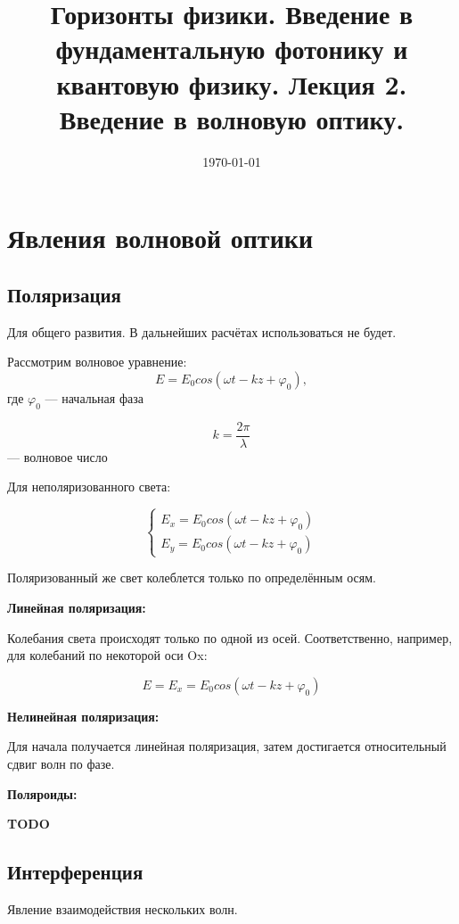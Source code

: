 \documentclass[a4paper,12pt]{article}
\author{}
\title{
Горизонты физики.
Введение в фундаментальную фотонику и квантовую физику.
Лекция 2.
Введение в волновую оптику.
}
\date{\today}
\begin{document}
	\maketitle

	\newpage
	
	\section{Явления волновой оптики}
		\subsection{Поляризация}
		Для общего развития. В дальнейших расчётах использоваться не будет.
		
		Рассмотрим волновое уравнение:
		$$ E = E_0cos(\omega t - kz + \varphi_0), $$ где $\varphi_0$ --- начальная фаза
		
		$$ k = \frac{2 \pi}{\lambda} $$ --- волновое число
		
		Для неполяризованного света:		
		
		\begin{equation*}
		\begin{cases}
   			E_x = E_0cos(\omega t - kz + \varphi_0)\\
   			E_y = E_0cos(\omega t - kz + \varphi_0)
 		\end{cases}
		\end{equation*}
		
		Поляризованный же свет колеблется только по определённым осям.
		
		\vspace{0.5cm}
		\textbf{Линейная поляризация:}
		
		Колебания света происходят только по одной из осей. Соответственно, например, для колебаний по некоторой оси Ox:
		
		$$ E = E_x = E_0cos(\omega t - kz + \varphi_0) $$
		
		\vspace{0.5cm}
		\textbf{Нелинейная поляризация:}
		
		Для начала получается линейная поляризация, затем достигается относительный сдвиг волн по фазе.
		
		\vspace{0.5cm}
		\textbf{Поляроиды:}
		
		\textbf{TODO}
		
		\subsection{Интерференция}
		Явление взаимодействия нескольких волн.
		
\end{document}
